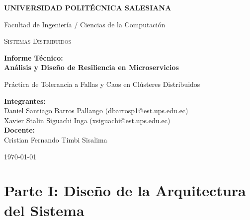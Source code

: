 \documentclass[12pt,letterpaper]{article}
\begin{document}
\begin{titlepage}
    \centering
    \vspace*{2cm}
    {\large \textbf{UNIVERSIDAD POLITÉCNICA SALESIANA} \par}
    {\large Facultad de Ingeniería / Ciencias de la Computación \par}
    \vspace{1.5cm}
    {\scshape\Large Sistemas Distribuidos \par}
    \vspace{1cm}
    {\huge\bfseries Informe Técnico: \\ Análisis y Diseño de Resiliencia en Microservicios \par}
    \vspace{0.5cm}
    {\large Práctica de Tolerancia a Fallas y Caos en Clústeres Distribuidos \par}
    \vspace{2cm}
    \textbf{Integrantes:}\\
    Daniel Santiago Barros Pallango (dbarrosp1@est.ups.edu.ec) \\
    Xavier Stalin Siguachi Inga (xsiguachi@est.ups.edu.ec) \\
    \vspace{1.5cm}
    \textbf{Docente:}\\
    Cristian Fernando Timbi Sisalima \\
    \vfill
    {\large \today \par}
\end{titlepage}

\newpage

\tableofcontents
\newpage

\section{Parte I: Diseño de la Arquitectura del Sistema}
\end{document}
